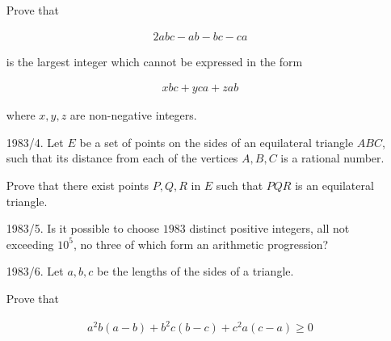 \documentclass[12pt]{article}
\begin{document}
\begin{enumerate}
Prove that

\begin{align*}
2abc-ab-bc-ca
\end{align*}

is the largest integer which cannot be expressed in the form

\begin{align*}
xbc+yca+zab
\end{align*}

where $x,y,z$ are non-negative integers.

\vspace{0.5cm}

\item[1983/4.]
Let $E$ be a set of points on the sides of an equilateral triangle $ABC$, such that its distance from each of the vertices $A,B,C$ is a rational number.

Prove that there exist points $P,Q,R$ in $E$ such that $PQR$ is an equilateral triangle.

\vspace{0.5cm}

\item[1983/5.]
Is it possible to choose $1983$ distinct positive integers, all not exceeding $10^5$, no three of which form an arithmetic progression?

\vspace{0.5cm}

\item[1983/6.]
Let $a,b,c$ be the lengths of the sides of a triangle.

Prove that

\begin{align*}
a^2b(a-b)+b^2c(b-c)+c^2a(c-a)\geq0
\end{align*}

\end{enumerate}
\end{document}

